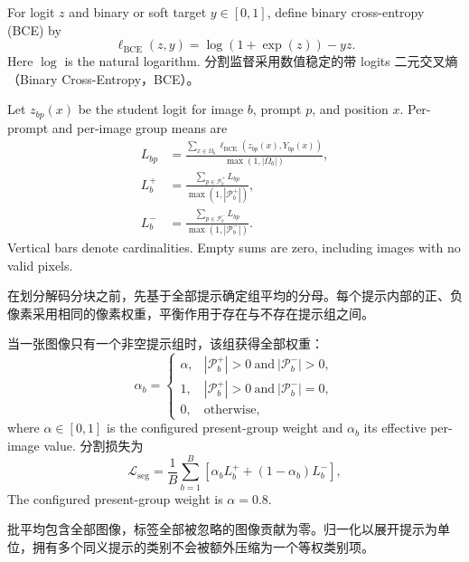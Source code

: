 For logit $z$ and binary or soft target $y\in[0,1]$, define binary cross-entropy (BCE) by
\begin{equation}
 \ell_{\mathrm{BCE}}(z,y)=\log(1+\exp(z))-yz.
 \label{eq:bce_definition}
\end{equation}
Here $\log$ is the natural logarithm. 分割监督采用数值稳定的带 logits 二元交叉熵（Binary Cross-Entropy，BCE）。

Let $z_{bp}(x)$ be the student logit for image $b$, prompt $p$, and position $x$. Per-prompt and per-image group means are
\begin{equation}
\begin{aligned}
 L_{bp}&=\frac{\sum_{x\in\Omega_b}\ell_{\mathrm{BCE}}(z_{bp}(x),Y_{bp}(x))}
                  {\max(1,|\Omega_b|)},\\
 L_b^+&=\frac{\sum_{p\in\mathcal P_b^+}L_{bp}}{\max(1,|\mathcal P_b^+|)},\\
 L_b^-&=\frac{\sum_{p\in\mathcal P_b^-}L_{bp}}{\max(1,|\mathcal P_b^-|)}.
\end{aligned}
\label{eq:group_means}
\end{equation}
Vertical bars denote cardinalities. Empty sums are zero, including images with no valid pixels.

在划分解码分块之前，先基于全部提示确定组平均的分母。每个提示内部的正、负像素采用相同的像素权重，平衡作用于存在与不存在提示组之间。

当一张图像只有一个非空提示组时，该组获得全部权重：
\begin{equation}
 \alpha_b=
 \begin{cases}
 \alpha, & |\mathcal P_b^+|>0\ \text{and}\ |\mathcal P_b^-|>0,\\
 1, & |\mathcal P_b^+|>0\ \text{and}\ |\mathcal P_b^-|=0,\\
 0, & \text{otherwise},
 \end{cases}
 \label{eq:group_weight}
\end{equation}
where $\alpha\in[0,1]$ is the configured present-group weight and $\alpha_b$ its effective per-image value. 分割损失为
\begin{equation}
 \mathcal L_{\mathrm{seg}}=\frac{1}{B}\sum_{b=1}^{B}
 [\alpha_b L_b^+ +(1-\alpha_b)L_b^-],
 \label{eq:segmentation_loss}
\end{equation}
The configured present-group weight is $\alpha=0.8$.

批平均包含全部图像，标签全部被忽略的图像贡献为零。归一化以展开提示为单位，拥有多个同义提示的类别不会被额外压缩为一个等权类别项。

